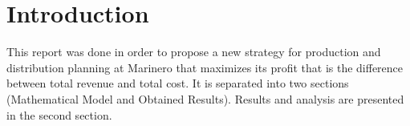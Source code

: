 \documentclass [a4paper,12pt,titlepage]{article}
\begin{document}

\begin{titlepage}
\end{titlepage}
\newpage
\tableofcontents

\newpage
\section*{Introduction}
This report was done in order to propose a new strategy for production and distribution planning at Marinero that maximizes its profit that is the difference between total revenue and total cost. It is separated into two sections (Mathematical Model and Obtained Results). Results and analysis are presented in the second section.
\end{document}
